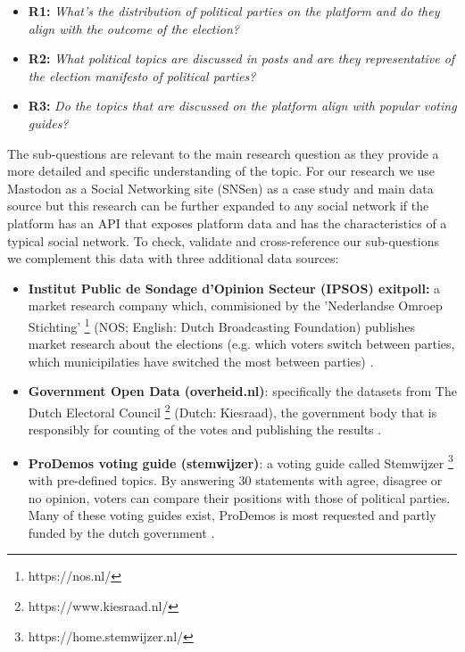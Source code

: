 \begin{itemize}
  \item \textbf{R1:} \textit{What's the distribution of political parties on the platform and do they align with the outcome of the election? }
  \item \textbf{R2:} \textit{What political topics are discussed in posts and are they representative of the election manifesto of political parties? }
  \item \textbf{R3:} \textit{Do the topics that are discussed on the platform align with popular voting guides?}
\end{itemize}

The sub-questions are relevant to the main research question as they provide a more detailed and specific understanding of the topic. For our research we use Mastodon as a Social Networking site (SNSen) as a case study and main data source but this research can be further expanded to any social network if the platform has an API that exposes platform data and has the characteristics of a typical social network. To check, validate and cross-reference our sub-questions we complement this data with three additional data sources: 

\begin{itemize}
  \item \textbf{Institut Public de Sondage d'Opinion Secteur (IPSOS) exitpoll:} a market research company which, commisioned by the 'Nederlandse Omroep Stichting' \footnote{https://nos.nl/} (NOS; English: Dutch Broadcasting Foundation) publishes market research about the elections (e.g. which voters switch between parties, which municipilaties have switched the most between parties) \cite{nos}.
  \item \textbf{Government Open Data (overheid.nl)}: specifically the datasets from The Dutch Electoral Council \footnote{https://www.kiesraad.nl/} (Dutch: Kiesraad), the government body that is responsibly for counting of the votes and publishing the results \cite{kiesraad}.
  \item \textbf{ProDemos voting guide (stemwijzer)}: a voting guide called Stemwijzer \footnote{https://home.stemwijzer.nl/} with pre-defined topics. By answering 30 statements with agree, disagree or no opinion, voters can compare their positions with those of political parties. Many of these voting guides exist, ProDemos is most requested and partly funded by the dutch government \cite{prodemos}.
\end{itemize}
